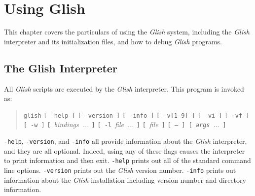 
\chapter{Using Glish}
\label{using-glish}
\begin{sloppy}

This chapter covers the particulars of using the {\em Glish} system, including
the {\em Glish} interpreter and its initialization files, and how to
debug {\em Glish}
programs.

\section{The Glish Interpreter}
\label{interpreter}

All {\em Glish} scripts are executed by the {\em Glish} interpreter.  This program
is invoked as:
\begin{quote}
\begin{list}{}{}
\item[{\tt glish}]
     \mbox{{\tt [ -help ]}} \mbox{{\tt [ -version ]}} \mbox{{\tt [ -info ]}} \mbox{{\tt [ -v[1-9] ]}} \mbox{{\tt [ -vi ]}} \mbox{{\tt [ -vf ]}} \mbox{{\tt [ -w ]}} \mbox{{\tt [} {\em bindings $\ldots$} {\tt ]}} \mbox{{\tt [ -l} {\em file $\ldots$} {\tt ]}} \mbox{{\tt [} {\em file} {\tt ]}} \mbox{{\tt [ -- ] [ {\em args $\ldots$} ] }}
\end{list}
\end{quote}

{\tt -help}, {\tt -version}, and {\tt -info} all provide information about the
{\em Glish} interpreter, and they are all optional. Indeed, using any of these
flags causes the interpreter to print information and then exit. {\tt -help}
prints out all of the standard command line options. {\tt -version} prints
out the {\em Glish} version number. {\tt -info} prints out information
about the {\em Glish} installation including version number and
directory information.


\end{sloppy}
